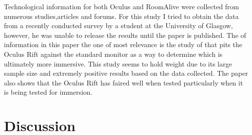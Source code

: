 \documentclass[a4paper]{article}
\begin{document}
\indent\indent Technological information for both Oculus and RoomAlive were collected from numerous studies,articles and forums. For this study I tried to obtain the data from a recently conducted survey\cite{8} by a student at the University of Glasgow, however, he was unable to release the results until the paper is published. The of information in this paper the one of most relevance is the study of that pits the Oculus Rift against the standard monitor as a way to determine which is ultimately more immersive. This study seems to hold weight due to its large sample size and extremely positive results based on the data collected. The paper also shows that the Oculus Rift has faired well when tested particularly when it is being tested for immersion.

\section{Discussion}
\end{document}
